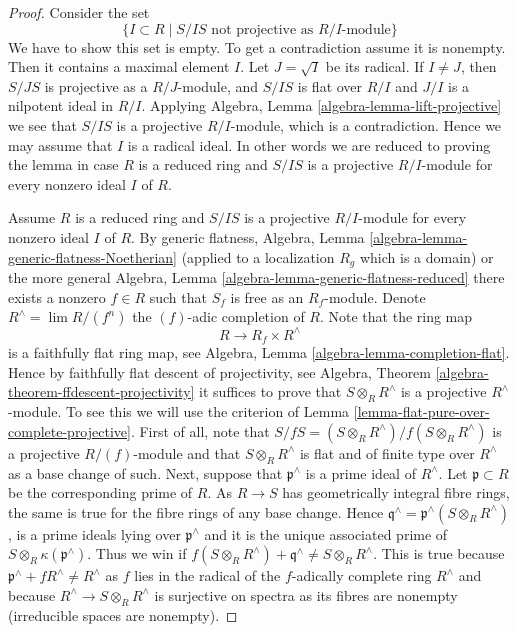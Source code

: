 \begin{proof}
Consider the set
$$
\{I \subset R \mid S/IS\text{ not projective as }R/I\text{-module}\}
$$
We have to show this set is empty. To get a contradiction assume it is
nonempty. Then it contains a maximal element $I$.
Let $J = \sqrt{I}$ be its radical. If $I \not = J$, then
$S/JS$ is projective as a $R/J$-module, and $S/IS$ is flat over $R/I$
and $J/I$ is a nilpotent ideal in $R/I$. Applying
Algebra, Lemma \ref{algebra-lemma-lift-projective}
we see that $S/IS$ is a projective $R/I$-module, which is a contradiction.
Hence we may assume that $I$ is a radical ideal. In other words we
are reduced to proving the lemma in case $R$ is a reduced ring and
$S/IS$ is a projective $R/I$-module for every nonzero ideal $I$
of $R$.

\medskip\noindent
Assume $R$ is a reduced ring and $S/IS$ is a projective $R/I$-module
for every nonzero ideal $I$ of $R$. By generic flatness,
Algebra, Lemma \ref{algebra-lemma-generic-flatness-Noetherian}
(applied to a localization $R_g$ which is a domain) or the more general
Algebra, Lemma \ref{algebra-lemma-generic-flatness-reduced}
there exists a nonzero $f \in R$ such that $S_f$ is free as an
$R_f$-module. Denote $R^\wedge = \lim R/(f^n)$ the $(f)$-adic completion
of $R$. Note that the ring map
$$
R \longrightarrow R_f \times R^\wedge
$$
is a faithfully flat ring map, see
Algebra, Lemma \ref{algebra-lemma-completion-flat}.
Hence by faithfully flat descent of projectivity, see
Algebra, Theorem \ref{algebra-theorem-ffdescent-projectivity}
it suffices to prove that $S \otimes_R R^\wedge$ is a projective
$R^\wedge$-module. To see this we will use the criterion of
Lemma \ref{lemma-flat-pure-over-complete-projective}.
First of all, note that $S/fS = (S \otimes_R R^\wedge)/f(S \otimes_R R^\wedge)$
is a projective $R/(f)$-module and that $S \otimes_R R^\wedge$ is flat
and of finite type over $R^\wedge$ as a base change of such.
Next, suppose that $\mathfrak p^\wedge$ is a prime ideal
of $R^\wedge$. Let $\mathfrak p \subset R$ be the corresponding prime
of $R$. As $R \to S$ has geometrically integral fibre rings, the
same is true for the fibre rings of any base change. Hence
$\mathfrak q^\wedge = \mathfrak p^\wedge(S \otimes_R R^\wedge)$,
is a prime ideals lying over $\mathfrak p^\wedge$
and it is the unique associated prime of
$S \otimes_R \kappa(\mathfrak p^\wedge)$. Thus we win if
$f(S \otimes_R R^\wedge) + \mathfrak q^\wedge \not = S \otimes_R R^\wedge$.
This is true because $\mathfrak p^\wedge + fR^\wedge \not = R^\wedge$
as $f$ lies in the radical of the $f$-adically complete ring $R^\wedge$
and because $R^\wedge \to S \otimes_R R^\wedge$ is surjective on spectra
as its fibres are nonempty (irreducible spaces are nonempty).
\end{proof}

